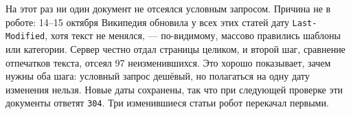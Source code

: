На этот раз ни один документ не отсеялся условным запросом. Причина не в
роботе: 14--15 октября Википедия обновила у всех этих статей дату
\texttt{Last-Modified}, хотя текст не менялся, --- по-видимому, массово правились
шаблоны или категории. Сервер честно отдал страницы целиком, и второй шаг,
сравнение отпечатков текста, отсеял 97 неизменившихся. Это хорошо показывает,
зачем нужны оба шага: условный запрос дешёвый, но полагаться на одну дату
изменения нельзя. Новые даты сохранены, так что при следующей проверке эти
документы ответят \texttt{304}. Три изменившиеся статьи робот перекачал первыми.

\pagebreak
